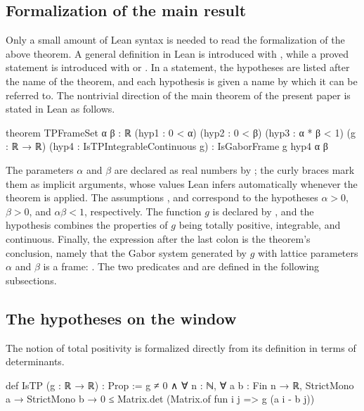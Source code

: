 \documentclass[reqno,a4paper,12pt]{amsart}
\numberwithin{equation}{section}
\newcommand\1{\mathds{1}}
\begin{document}
\subsection{Formalization of the main result}

Only a small amount of Lean syntax is needed to read the formalization of the above theorem. A general definition in Lean is introduced with , while a proved statement is introduced with  or . In a statement, the hypotheses are listed after the name of the theorem, and each hypothesis is given a name by which it can be referred to. The nontrivial direction of the main theorem of the present paper is stated in Lean as follows.

\begin{leancode}
theorem TPFrameSet
    {α β : ℝ} (hyp1 : 0 < α) (hyp2 : 0 < β) (hyp3 : α * β < 1)
    (g : ℝ → ℝ) (hyp4 : IsTPIntegrableContinuous g) :
    IsGaborFrame g hyp4 α β
\end{leancode}

The parameters $\alpha$ and $\beta$ are declared as real numbers by ; the curly braces mark them as implicit arguments, whose values Lean infers automatically whenever the theorem is applied. The assumptions ,  and  correspond to the hypotheses $\alpha>0$, $\beta>0$, and $\alpha\beta<1$, respectively. The function $g$ is declared by , and the hypothesis  combines the properties of $g$ being totally positive, integrable, and continuous. Finally, the expression after the last colon is the theorem's conclusion, namely that the Gabor system generated by $g$ with lattice parameters $\alpha$ and $\beta$ is a frame: . The two predicates  and  are defined in the following subsections.

\subsection{The hypotheses on the window}

The notion of total positivity is formalized directly from its definition in terms of determinants.

\begin{leancode}
def IsTP (g : ℝ → ℝ) : Prop :=
  g ≠ 0 ∧
  ∀ n : ℕ, ∀ a b : Fin n → ℝ,
    StrictMono a → StrictMono b →
    0 ≤ Matrix.det (Matrix.of fun i j => g (a i - b j))
\end{leancode}
\end{document}
